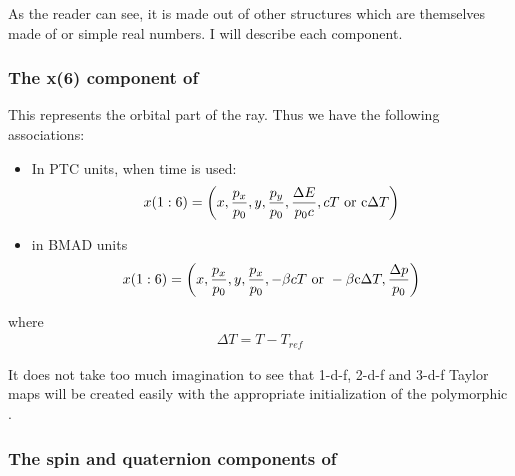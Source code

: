 \documentclass[english,12pt,article]{article} %
\begin{document}
As the reader can see, it is made out of other structures which are themselves made of  or simple real numbers.  I will describe each component.

 
  
  

  \subsubsection{The   x(6) component of   }\label{sec:codetype}

 This represents the orbital part of the ray. Thus we have the following associations:
 
 \begin{itemize}
\item In PTC units, when time is used: 
%
\begin{align} x(1:6)=
\left({x,{{p}_{x} \over {p}_{0}},y,{{p}_{y} \over {p}_{0}},{\Delta E \over {p}_{0}c},cT~{\rm o}{\rm r}~{\rm c}\Delta T}\right) \end{align}
\item in BMAD units
%
\begin{align} x(1:6)=
\left({x,{{p}_{x} \over {p}_{0}},y,{{p}_{x} \over {p}_{0}},-\beta cT~{\rm o}{\rm r}~-\beta {\rm c}\Delta T,{\Delta p \over {p}_{0}}}\right) \end{align}
\end{itemize}
where
%
\begin{align} \Delta T=
T-{T}_{ref} \end{align}

It does not take too much imagination to see that 1-d-f, 2-d-f and 3-d-f Taylor maps will be created easily with the appropriate initialization of the polymorphic . 

  \subsubsection{The   spin and quaternion components of   }\label{sec:code spin}
\end{document}
